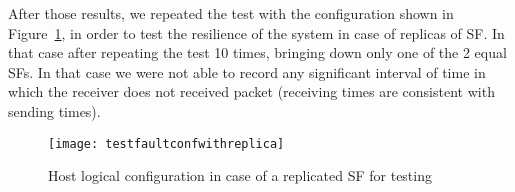 After those results, we repeated the test with the configuration shown in Figure~\ref{chap:tests:sec:fault:img:testfaultconfwithreplica}, in order to test the resilience of the system in case of replicas of SF. In that case after repeating the test 10 times, bringing down only one of the 2 equal SFs. In that case we were not able to record any significant interval of time in which the receiver does not received packet (receiving times are consistent with sending times).
\begin{figure}[H]
  \centering
  \texttt{[image: testfaultconfwithreplica]}
  \caption{Host logical configuration in case of a replicated SF for testing}
  \label{chap:tests:sec:fault:img:testfaultconfwithreplica}
\end{figure}